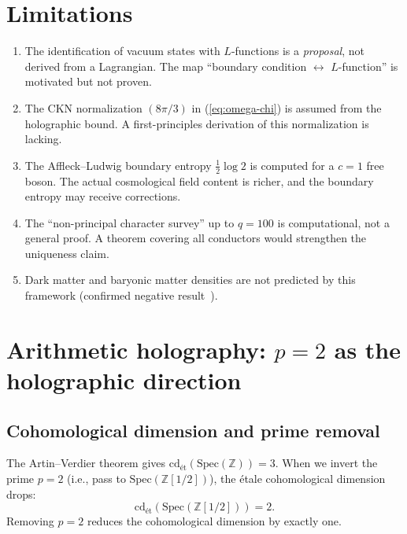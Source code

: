 \documentclass[11pt,a4paper]{article}
\begin{document}
\section{Limitations}

\begin{enumerate}
\item The identification of vacuum states with $L$-functions is
a \emph{proposal}, not derived from a Lagrangian. The map
``boundary condition $\leftrightarrow$ $L$-function'' is
motivated but not proven.

\item The CKN normalization $(8\pi/3)$ in (\ref{eq:omega-chi})
is assumed from the holographic bound. A first-principles
derivation of this normalization is lacking.

\item The Affleck--Ludwig boundary entropy $\frac{1}{2}\log 2$
is computed for a $c = 1$ free boson. The actual cosmological
field content is richer, and the boundary entropy may receive
corrections.

\item The ``non-principal character survey'' up to $q = 100$ is
computational, not a general proof. A theorem covering all
conductors would strengthen the uniqueness claim.

\item Dark matter and baryonic matter densities are not predicted
by this framework (confirmed negative
result~\cite{wb-euler-sectors}).
\end{enumerate}

\section{Arithmetic holography: $p = 2$ as the holographic direction}

\subsection{Cohomological dimension and prime removal}

The Artin--Verdier theorem gives $\mathrm{cd}_{\text{\'et}}(\mathrm{Spec}(\mathbb{Z})) = 3$.
When we invert the prime $p = 2$ (i.e., pass to $\mathrm{Spec}(\mathbb{Z}[1/2])$),
the \'etale cohomological dimension drops:
\begin{equation}
\mathrm{cd}_{\text{\'et}}(\mathrm{Spec}(\mathbb{Z}[1/2])) = 2.
\end{equation}
Removing $p = 2$ reduces the cohomological dimension by exactly one.
\end{document}
